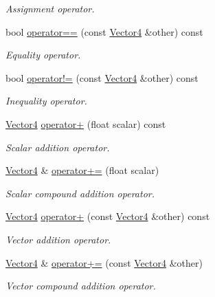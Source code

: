 \begin{DoxyCompactItemize}
\begin{DoxyCompactList}\small\item\em Assignment operator. \end{DoxyCompactList}\item 
bool \hyperlink{classchaos_1_1gfx_1_1_vector4_add5671fb46f71d2196a68e2746309463}{operator==} (const \hyperlink{classchaos_1_1gfx_1_1_vector4}{Vector4} \&other) const 
\begin{DoxyCompactList}\small\item\em Equality operator. \end{DoxyCompactList}\item 
bool \hyperlink{classchaos_1_1gfx_1_1_vector4_ae0ac2f2346e0e56523f8f263286d3954}{operator!=} (const \hyperlink{classchaos_1_1gfx_1_1_vector4}{Vector4} \&other) const 
\begin{DoxyCompactList}\small\item\em Inequality operator. \end{DoxyCompactList}\item 
\hyperlink{classchaos_1_1gfx_1_1_vector4}{Vector4} \hyperlink{classchaos_1_1gfx_1_1_vector4_aaa1fe6160bb530edada4723daa4276e0}{operator+} (float scalar) const 
\begin{DoxyCompactList}\small\item\em Scalar addition operator. \end{DoxyCompactList}\item 
\hyperlink{classchaos_1_1gfx_1_1_vector4}{Vector4} \& \hyperlink{classchaos_1_1gfx_1_1_vector4_a1ee838a2da3e2595838769850a4a945f}{operator+=} (float scalar)
\begin{DoxyCompactList}\small\item\em Scalar compound addition operator. \end{DoxyCompactList}\item 
\hyperlink{classchaos_1_1gfx_1_1_vector4}{Vector4} \hyperlink{classchaos_1_1gfx_1_1_vector4_ab6631a4c686e6878d8d4212369300372}{operator+} (const \hyperlink{classchaos_1_1gfx_1_1_vector4}{Vector4} \&other) const 
\begin{DoxyCompactList}\small\item\em Vector addition operator. \end{DoxyCompactList}\item 
\hyperlink{classchaos_1_1gfx_1_1_vector4}{Vector4} \& \hyperlink{classchaos_1_1gfx_1_1_vector4_afda4d8356ac748b55f100ca9598fa6ab}{operator+=} (const \hyperlink{classchaos_1_1gfx_1_1_vector4}{Vector4} \&other)
\begin{DoxyCompactList}\small\item\em Vector compound addition operator. \end{DoxyCompactList}\item 

\end{DoxyCompactItemize}
